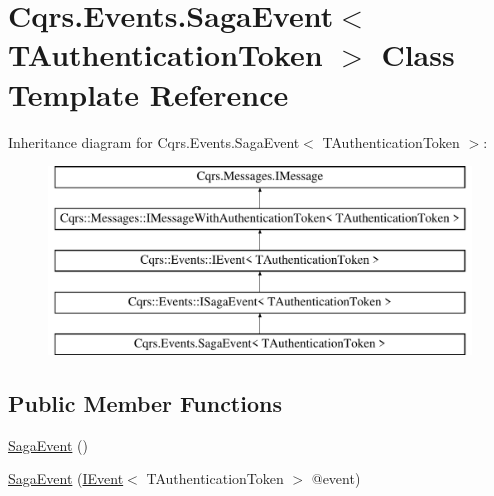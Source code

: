 \hypertarget{classCqrs_1_1Events_1_1SagaEvent}{}\section{Cqrs.\+Events.\+Saga\+Event$<$ T\+Authentication\+Token $>$ Class Template Reference}
\label{classCqrs_1_1Events_1_1SagaEvent}
Inheritance diagram for Cqrs.\+Events.\+Saga\+Event$<$ T\+Authentication\+Token $>$\+:\begin{figure}[H]
\begin{center}
\leavevmode
\includegraphics[height=5.000000cm]{classCqrs_1_1Events_1_1SagaEvent}
\end{center}
\end{figure}
\subsection*{Public Member Functions}
\begin{DoxyCompactItemize}
\item 
\hyperlink{classCqrs_1_1Events_1_1SagaEvent_a658ce04baccb816bf132702cccaa6a90_a658ce04baccb816bf132702cccaa6a90}{Saga\+Event} ()
\item 
\hyperlink{classCqrs_1_1Events_1_1SagaEvent_aeb42f8e8f8e18bffe0dbe55b3da3c476_aeb42f8e8f8e18bffe0dbe55b3da3c476}{Saga\+Event} (\hyperlink{interfaceCqrs_1_1Events_1_1IEvent}{I\+Event}$<$ T\+Authentication\+Token $>$ @event)
\end{DoxyCompactItemize}
